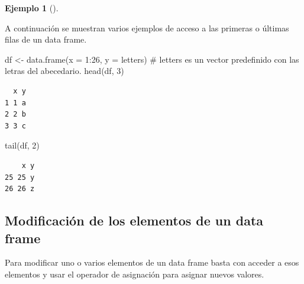 \documentclass[
  a4paper,
]{scrreport}
\newenvironment{Shaded}{\begin{snugshade}}{\end{snugshade}}
\newcommand{\AttributeTok}[1]{\textcolor[rgb]{0.40,0.45,0.13}{#1}}
\newcommand{\CommentTok}[1]{\textcolor[rgb]{0.37,0.37,0.37}{#1}}
\newcommand{\DecValTok}[1]{\textcolor[rgb]{0.68,0.00,0.00}{#1}}
\newcommand{\FunctionTok}[1]{\textcolor[rgb]{0.28,0.35,0.67}{#1}}
\newcommand{\NormalTok}[1]{\textcolor[rgb]{0.00,0.23,0.31}{#1}}
\newcommand{\OtherTok}[1]{\textcolor[rgb]{0.00,0.23,0.31}{#1}}
\newcommand{\SpecialCharTok}[1]{\textcolor[rgb]{0.37,0.37,0.37}{#1}}
\theoremstyle{definition}
\theoremstyle{definition}
\newtheorem{example}{Ejemplo}[chapter]
\theoremstyle{remark}
\begin{document}
\leavevmode{}%
\begin{example}[]\label{exm-acceso-primeras-ultimas-filas-data-frame}

A continuación se muestran varios ejemplos de acceso a las primeras o
últimas filas de un data frame.

\begin{Shaded}
\begin{Highlighting}[]
\NormalTok{df }\OtherTok{\textless{}{-}} \FunctionTok{data.frame}\NormalTok{(}\AttributeTok{x =} \DecValTok{1}\SpecialCharTok{:}\DecValTok{26}\NormalTok{, }\AttributeTok{y =}\NormalTok{ letters) }\CommentTok{\# letters es un vector predefinido con las letras del abecedario.}
\FunctionTok{head}\NormalTok{(df, }\DecValTok{3}\NormalTok{)}
\end{Highlighting}
\end{Shaded}

\begin{verbatim}
  x y
1 1 a
2 2 b
3 3 c
\end{verbatim}

\begin{Shaded}
\begin{Highlighting}[]
\FunctionTok{tail}\NormalTok{(df, }\DecValTok{2}\NormalTok{)}
\end{Highlighting}
\end{Shaded}

\begin{verbatim}
    x y
25 25 y
26 26 z
\end{verbatim}

\end{example}

\hypertarget{modificaciuxf3n-de-los-elementos-de-un-data-frame}{%
\subsection{Modificación de los elementos de un data
frame}\label{modificaciuxf3n-de-los-elementos-de-un-data-frame}}

Para modificar uno o varios elementos de un data frame basta con acceder
a esos elementos y usar el operador de asignación para asignar nuevos
valores.
\end{document}
